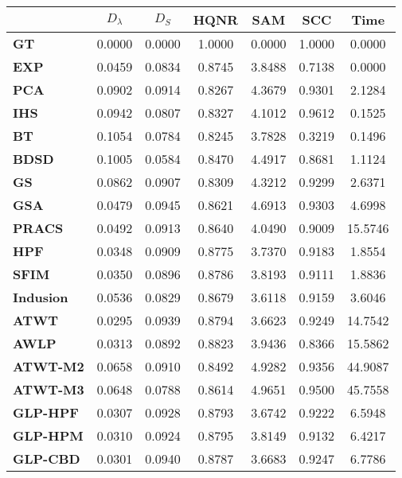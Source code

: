 \begin{tabular}{|l|c|c|c|c|c|c|}
\hline
&\textbf{$D_{\lambda}$}&\textbf{$D_{S}$}&\textbf{HQNR}&\textbf{SAM}&\textbf{SCC}&\textbf{Time}\\\hline
\textbf{GT}&0.0000&0.0000&1.0000&0.0000&1.0000&0.0000\\\hline
\textbf{EXP}&0.0459&0.0834&0.8745&3.8488&0.7138&0.0000\\\hline
\textbf{PCA}&0.0902&0.0914&0.8267&4.3679&0.9301&2.1284\\\hline
\textbf{IHS}&0.0942&0.0807&0.8327&4.1012&0.9612&0.1525\\\hline
\textbf{BT}&0.1054&0.0784&0.8245&3.7828&0.3219&0.1496\\\hline
\textbf{BDSD}&0.1005&0.0584&0.8470&4.4917&0.8681&1.1124\\\hline
\textbf{GS}&0.0862&0.0907&0.8309&4.3212&0.9299&2.6371\\\hline
\textbf{GSA}&0.0479&0.0945&0.8621&4.6913&0.9303&4.6998\\\hline
\textbf{PRACS}&0.0492&0.0913&0.8640&4.0490&0.9009&15.5746\\\hline
\textbf{HPF}&0.0348&0.0909&0.8775&3.7370&0.9183&1.8554\\\hline
\textbf{SFIM}&0.0350&0.0896&0.8786&3.8193&0.9111&1.8836\\\hline
\textbf{Indusion}&0.0536&0.0829&0.8679&3.6118&0.9159&3.6046\\\hline
\textbf{ATWT}&0.0295&0.0939&0.8794&3.6623&0.9249&14.7542\\\hline
\textbf{AWLP}&0.0313&0.0892&0.8823&3.9436&0.8366&15.5862\\\hline
\textbf{ATWT-M2}&0.0658&0.0910&0.8492&4.9282&0.9356&44.9087\\\hline
\textbf{ATWT-M3}&0.0648&0.0788&0.8614&4.9651&0.9500&45.7558\\\hline
\textbf{GLP-HPF}&0.0307&0.0928&0.8793&3.6742&0.9222&6.5948\\\hline
\textbf{GLP-HPM}&0.0310&0.0924&0.8795&3.8149&0.9132&6.4217\\\hline
\textbf{GLP-CBD}&0.0301&0.0940&0.8787&3.6683&0.9247&6.7786\\\hline
\end{tabular}
